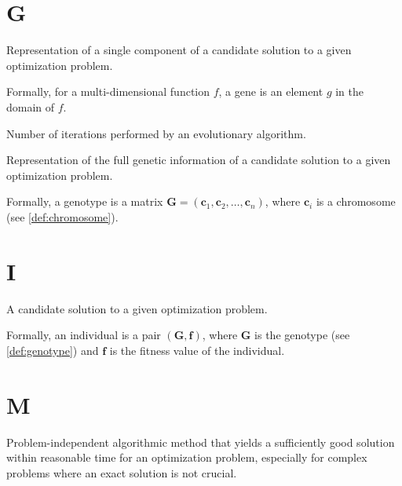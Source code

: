   \section*{G}
    \begin{Definition}[Gene]
    \label{def:gene}
      Representation of a single component of a candidate solution to a given optimization problem.

      Formally, for a multi-dimensional function \(f\), a gene is an element \(g\) in the domain of
      \(f\).
    \end{Definition}

    \begin{Definition}[Generation]
    \label{def:generation}
      Number of iterations performed by an evolutionary algorithm.
    \end{Definition}

    \begin{Definition}[Genotype]
    \label{def:genotype}
      Representation of the full genetic information of a candidate solution to a given optimization
      problem.

      Formally, a genotype is a matrix \(\mathbf{G} = (\textbf{c}_1, \textbf{c}_2, \dots, 
      \textbf{c}_n)\), where \(\textbf{c}_i\) is a chromosome (see \vref{def:chromosome}).
    \end{Definition}

  \section*{I}
    \begin{Definition}[Individual]
    \label{def:individual}
      A candidate solution to a given optimization problem.

      Formally, an individual is a pair \((\mathbf{G}, \mathbf{f})\), where \(\mathbf{G}\) is the
      genotype (see \vref{def:genotype}) and \(\mathbf{f}\) is the fitness value of the
      individual.
    \end{Definition}

  \section*{M}
    \begin{Definition}[Metaheuristics]
    \label{def:metaheuristic}
      Problem-independent algorithmic method that yields a sufficiently good solution within 
      reasonable time for an optimization problem, especially for complex problems where an exact 
      solution is not crucial.
    \end{Definition}

